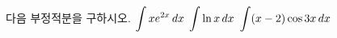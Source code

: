 다음 부정적분을 구하시오.
 $\displaystyle\int xe^{2x}\mkern3mu dx$
 $\displaystyle\int \ln x\mkern3mu dx$
 $\displaystyle\int (x-2)\cos 3x\mkern3mu dx$
